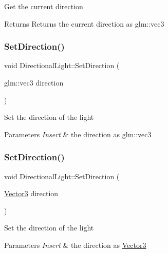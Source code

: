 Get the current direction \begin{DoxyReturn}{Returns}
Returns the current direction as glm\+::vec3 
\end{DoxyReturn}
\mbox{\label{class_directional_light_ac7c9991c4cc29777c24ebe6ee5c96938}} 
\subsubsection{\texorpdfstring{SetDirection()}{SetDirection()}\hspace{0.1cm}{\footnotesize\ttfamily [1/2]}}
{\footnotesize\ttfamily void Directional\+Light\+::\+Set\+Direction (\begin{DoxyParamCaption}\item[{glm\+::vec3}]{direction }\end{DoxyParamCaption})}

Set the direction of the light 
\begin{DoxyParams}{Parameters}
{\em Insert} & the direction as glm\+::vec3 \\
\hline
\end{DoxyParams}
\mbox{\label{class_directional_light_a18772d74dec2b5067c4e6197b9719c3c}} 
\subsubsection{\texorpdfstring{SetDirection()}{SetDirection()}\hspace{0.1cm}{\footnotesize\ttfamily [2/2]}}
{\footnotesize\ttfamily void Directional\+Light\+::\+Set\+Direction (\begin{DoxyParamCaption}\item[{\mbox{\hyperlink{struct_vector3}{Vector3}}}]{direction }\end{DoxyParamCaption})}

Set the direction of the light 
\begin{DoxyParams}{Parameters}
{\em Insert} & the direction as \mbox{\hyperlink{struct_vector3}{Vector3}} \\
\hline
\end{DoxyParams}
\mbox{\label{class_directional_light_ac5f9c91c9b6c8c0cdc71bbddd053f717}} 
